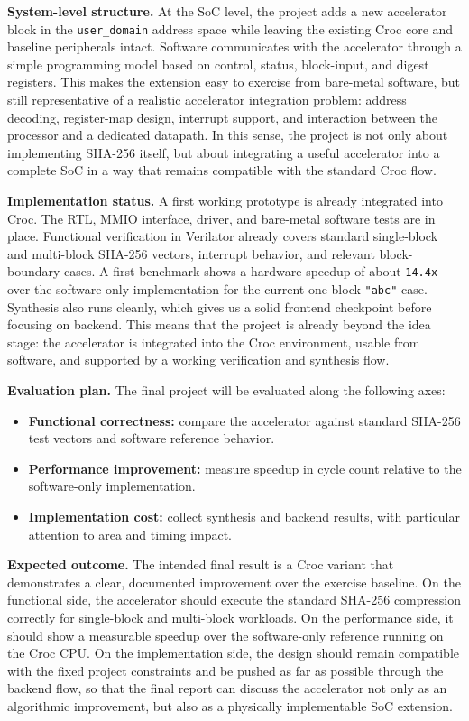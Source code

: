 \documentclass[10pt,a4paper]{article}
\begin{document}
\textbf{System-level structure.}
At the SoC level, the project adds a new accelerator block in the
\texttt{user\_domain} address space while leaving the existing Croc core and
baseline peripherals intact. Software communicates with the accelerator through
a simple programming model based on control, status, block-input, and digest
registers. This makes the extension easy to exercise from bare-metal software,
but still representative of a realistic accelerator integration problem:
address decoding, register-map design, interrupt support, and interaction
between the processor and a dedicated datapath. In this sense, the project is
not only about implementing SHA-256 itself, but about integrating a useful
accelerator into a complete SoC in a way that remains compatible with the
standard Croc flow.

\textbf{Implementation status.}
A first working prototype is already integrated into Croc. The RTL, MMIO
interface, driver, and bare-metal software tests are in place. Functional
verification in Verilator already covers standard single-block and multi-block
SHA-256 vectors, interrupt behavior, and relevant block-boundary cases. A first
benchmark shows a hardware speedup of about \texttt{14.4x} over the software-only
implementation for the current one-block \texttt{"abc"} case. Synthesis also runs
cleanly, which gives us a solid frontend checkpoint before focusing on backend.
This means that the project is already beyond the idea stage: the accelerator is
integrated into the Croc environment, usable from software, and supported by a
working verification and synthesis flow.

\textbf{Evaluation plan.}
The final project will be evaluated along the following axes:
\begin{itemize}
  \item \textbf{Functional correctness:} compare the accelerator against
  standard SHA-256 test vectors and software reference behavior.
  \item \textbf{Performance improvement:} measure speedup in cycle count
  relative to the software-only implementation.
  \item \textbf{Implementation cost:} collect synthesis and backend results,
  with particular attention to area and timing impact.
\end{itemize}

\textbf{Expected outcome.}
The intended final result is a Croc variant that demonstrates a clear,
documented improvement over the exercise baseline. On the functional side, the
accelerator should execute the standard SHA-256 compression correctly for
single-block and multi-block workloads. On the performance side, it should show
a measurable speedup over the software-only reference running on the Croc CPU.
On the implementation side, the design should remain compatible with the fixed
project constraints and be pushed as far as possible through the backend flow,
so that the final report can discuss the accelerator not only as an algorithmic
improvement, but also as a physically implementable SoC extension.
\end{document}
